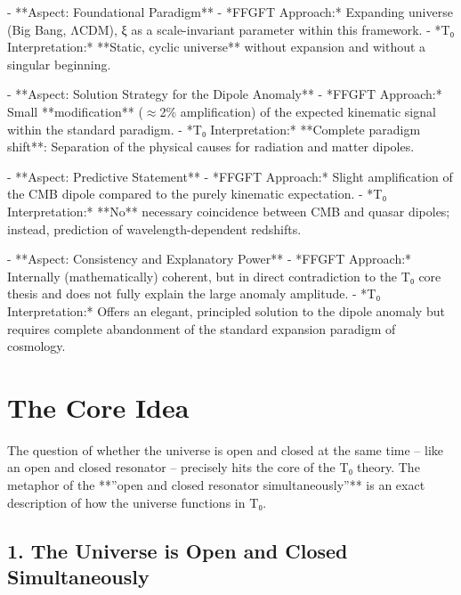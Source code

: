 	- **Aspect: Foundational Paradigm**
	- *FFGFT Approach:* Expanding universe (Big Bang, ΛCDM), ξ as a scale-invariant parameter within this framework.
	- *T₀ Interpretation:* **Static, cyclic universe** without expansion and without a singular beginning.
	
	- **Aspect: Solution Strategy for the Dipole Anomaly**
	- *FFGFT Approach:* Small **modification** ($\approx$2\% amplification) of the expected kinematic signal within the standard paradigm.
	- *T₀ Interpretation:* **Complete paradigm shift**: Separation of the physical causes for radiation and matter dipoles.
	
	- **Aspect: Predictive Statement**
	- *FFGFT Approach:* Slight amplification of the CMB dipole compared to the purely kinematic expectation.
	- *T₀ Interpretation:* **No** necessary coincidence between CMB and quasar dipoles; instead, prediction of wavelength-dependent redshifts.
	
	- **Aspect: Consistency and Explanatory Power**
	- *FFGFT Approach:* Internally (mathematically) coherent, but in direct contradiction to the T₀ core thesis and does not fully explain the large anomaly amplitude.
	- *T₀ Interpretation:* Offers an elegant, principled solution to the dipole anomaly but requires complete abandonment of the standard expansion paradigm of cosmology.
	
	\section*{The Core Idea}
	
	The question of whether the universe is open and closed at the same time – like an open and closed resonator – precisely hits the core of the T₀ theory. The metaphor of the **''open and closed resonator simultaneously''** is an exact description of how the universe functions in T₀.
	
	\subsection*{1. The Universe is Open and Closed Simultaneously}
	
